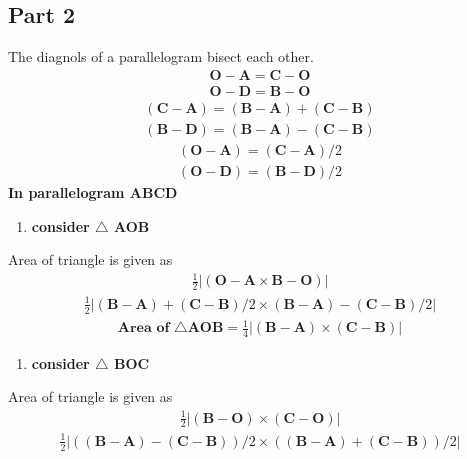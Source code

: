 \documentclass[journal,10pt,twocolumn]{article}
\let\vec\mathbf
\begin{document}
\subsection*{Part 2}
The diagnols of a parallelogram bisect each other. 
\begin{align}
\vec{O-A} =\vec{C-O} 
\end{align}
\begin{align}
			\vec{O-D} =\vec{B-O} 
\end{align}
\begin{align}
	(\vec{C-A}) =(\vec{B-A}) + (\vec{C-B})
\end{align}
\begin{align}
	(\vec{B-D}) =(\vec{B-A}) - (\vec{C-B})
\end{align}
\begin{align}
	(\vec{O-A}) =(\vec{C-A})/2
\end{align}
\begin{align}
	(\vec{O-D}) =(\vec{B-D})/2
\end{align}
\textbf{In parallelogram ABCD} \vspace{2mm} \\
\begin{enumerate}[1.]
\item \textbf{consider $\triangle$ AOB}
\end{enumerate}
Area of triangle is given as 
\begin{align}
	\frac{1}{2}{\left | (\vec{O-A}\times\vec{B-O})\right |}
\end{align}
\begin{align}
	\frac{1}{2}{\left | (\vec{B-A})+(\vec{C-B})/2\times(\vec{B-A})-(\vec{C-B})/2\right |}
\end{align}
\begin{align}
	 \textbf{Area of $\triangle$AOB} = \frac{1}{4}{\left | (\vec{B-A})\times(\vec{C-B})\right |}
\end{align}
\vspace{5mm}
\begin{enumerate}[2.]
\item  \textbf{consider $\triangle$ BOC}
\end{enumerate}
Area of triangle is given as 
\begin{align}
	\frac{1}{2}{\left | (\vec{B-O})\times(\vec{C-O})\right |}
\end{align}
\begin{align}
	\frac{1}{2}{\left | ((\vec{B-A})-(\vec{C-B}))/2\times((\vec{B-A})+(\vec{C-B}))/2\right |}
\end{align}
\end{document}
